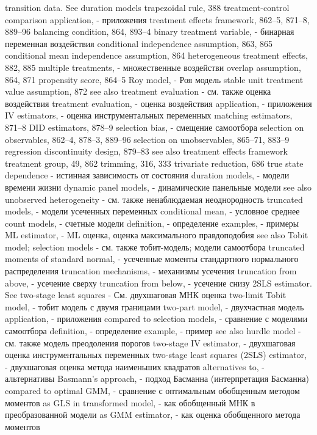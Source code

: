 transition data. See duration models 
trapezoidal rule, 388 treatment-control comparison
application, - приложения
treatment effects framework, 862–5, 871–8, 889–96
balancing condition, 864, 893–4
binary treatment variable, - бинарная переменная воздействия
conditional independence assumption, 863, 865 conditional mean independence assumption, 864 heterogeneous treatment effects, 882, 885 
multiple treatments, - множественные воздействи
overlap assumption, 864, 871
propensity score, 864–5
Roy model, - Роя модель
stable unit treatment value assumption, 872
see also treatment evaluation - см. также оценка воздействия
treatment evaluation, - оценка воздействия
application, - приложения
IV estimators, - оценка инструментальных переменных
matching estimators, 871–8
DID estimators, 878–9
selection bias, - смещение самоотбора
selection on observables, 862–4, 878–3, 889–96 selection on unobservables, 865–71, 883–9 regression discontinuity design, 879–83
see also treatment effects framework treatment group, 49, 862
trimming, 316, 333
trivariate reduction, 686
true state dependence - истинная зависимость от состояния
duration models, - модели времени жизни
dynamic panel models, - динамические панельные модели
see also unobserved heterogeneity - см. также ненаблюдаемая неоднородность
truncated models, - модели усеченных переменных
conditional mean, - условное среднее
count models, - счетные модели
definition, - определение
examples, - примеры
ML estimator, - ML оценка, оценка максимального правдоподобия
see also Tobit model; selection models - см. также тобит-модель; модели самоотбора
truncated moments of standard normal, - усеченные моменты стандартного нормального распределения
truncation mechanisms, - механизмы усечения
truncation from above, - усечение сверху
truncation from below, - усечение снизу
2SLS estimator. See two-stage least squares - См. двухшаговая МНК оценка
two-limit Tobit model, - тобит модель с двумя границами
two-part model, - двухчастная модель
application, - приложения
compared to selection models, - сравнение с моделями самоотбора
definition, - определение
example, - пример
see also hurdle model - см. также модель преодоления порогов
two-stage IV estimator, - двухшаговая оценка инструментальных переменных
two-stage least squares (2SLS) estimator, - двухшаговая оценка метода наименьших квадратов
alternatives to, - альтернативы
Basmann’s approach, - подход Басманна (интерпретация Басманна)
compared to optimal GMM, - сравнение с оптимальным обобщенным методом моментов
as GLS in transformed model, - как обобщенный МНК в преобразованной модели
as GMM estimator, - как оценка обобщенного метода моментов
